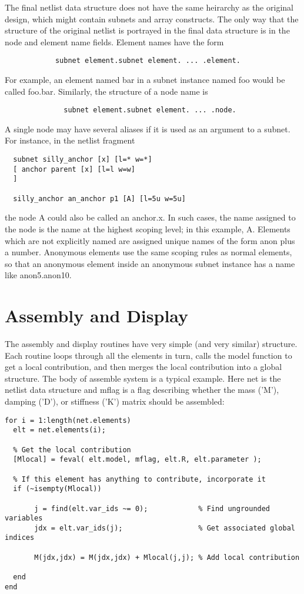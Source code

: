    The final netlist data structure does not have the same heirarchy as the
original design, which might contain subnets and array constructs. The only
way that the structure of the original netlist is portrayed in the final data
structure is in the node and element name fields. Element names have the form
\begin{verbatim}
            subnet element.subnet element. ... .element.
\end{verbatim}
For example, an element named bar in a subnet instance named foo would be
called foo.bar. Similarly, the structure of a node name is
\begin{verbatim}
              subnet element.subnet element. ... .node.
\end{verbatim}
A single node may have several aliases if it is used as an argument to a subnet.
For instance, in the netlist fragment
\begin{verbatim}
  subnet silly_anchor [x] [l=* w=*]
  [ anchor parent [x] [l=l w=w]
  ]

  silly_anchor an_anchor p1 [A] [l=5u w=5u]
\end{verbatim}
the node A could also be called an anchor.x. In such cases, the name assigned
to the node is the name at the highest scoping level; in this example, A. Elements
which are not explicitly named are assigned unique names of the form anon plus
a number. Anonymous elements use the same scoping rules as normal elements,
so that an anonymous element inside an anonymous subnet instance has a name
like anon5.anon10.

\section{Assembly and Display}

The assembly and display routines have very simple (and very similar) structure.
Each routine loops through all the elements in turn, calls the model function
to get a local contribution, and then merges the local contribution into a global
structure. The body of assemble system is a typical example. Here net is the
netlist data structure and mflag is a flag describing whether the mass ('M'),
damping ('D'), or stiffness ('K') matrix should be assembled:

\begin{verbatim}
for i = 1:length(net.elements)
  elt = net.elements(i);

  % Get the local contribution
  [Mlocal] = feval( elt.model, mflag, elt.R, elt.parameter );

  % If this element has anything to contribute, incorporate it
  if (~isempty(Mlocal))

       j = find(elt.var_ids ~= 0);            % Find ungrounded variables
       jdx = elt.var_ids(j);                  % Get associated global indices

       M(jdx,jdx) = M(jdx,jdx) + Mlocal(j,j); % Add local contribution

  end
end
\end{verbatim}

